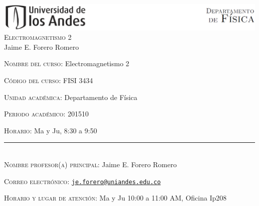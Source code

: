 \documentclass[letterpaper,10pt,onecolumn]{article}
\begin{document}
\begin{center}

\includegraphics[width=490pt]{header.png}\\[0.5cm]

\textsc{\LARGE Electromagnetismo 2}\\[0.1cm]

\large Jaime E. Forero Romero\\[0.5cm]

\end{center}

\large \noindent\textsc{Nombre del curso:}  Electromagnetismo 2%
  
\noindent\textsc{C\'odigo del curso:} FISI 3434 %

\noindent\textsc{Unidad acad\'emica:} Departamento de F\'isica

\noindent\textsc{Periodo acad\'emico:} 201510 %

\noindent\textsc{Horario:} Ma y Ju, 8:30 a 9:50%

\noindent\rule{\textwidth}{1pt}\\[-0.3cm]

\normalsize \noindent\textsc{Nombre profesor(a) principal:} Jaime
E. Forero Romero%

\noindent\textsc{Correo electr\'onico:}
\href{mailto:je.forero@uniandes.edu.co}{\nolinkurl{je.forero@uniandes.edu.co}}

\noindent\textsc{Horario y lugar de atenci\'on:} Ma y Ju 10:00 a
11:00 AM, Oficina Ip208 %


\end{document}
